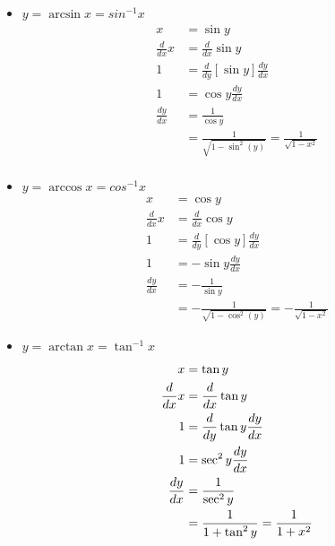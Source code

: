 \documentclass[12pt]{article}
\begin{document}
\begin{itemize}
    \item $y = \arcsin x = sin^{-1}x$
    \begin{equation}
    \begin{split}
        x &= \sin y \\
        \frac{d}{dx}x &= \frac{d}{dx} \sin y\\
        1 &= \frac{d}{dy}[\sin y]\frac{dy}{dx}\\
        1 &= \cos y \frac{dy}{dx}\\
        \frac{dy}{dx} &= \frac{1}{\cos y}\\
        &= \frac{1}{\sqrt{1-\sin^2(y)}} = \frac{1}{\sqrt{1-x^2}}\\
    \end{split}        
\end{equation}

    \item $y = \arccos x = cos^{-1}x$
    \begin{equation}
        \begin{split}
            x &= \cos y\\
            \frac{d}{dx} x &= \frac{d}{dx} \cos y\\
            1 &= \frac{d}{dy}[\cos y] \frac{dy}{dx}\\
            1 &= -\sin y \frac{dy}{dx}\\
            \frac{dy}{dx} &= -\frac{1}{\sin y}\\
            &= -\frac{1}{\sqrt{1-\cos^2(y)}} = -\frac{1}{\sqrt{1-x^2}}
        \end{split}
    \end{equation}

    \item $y = \arctan x = \tan^{-1} x$
    \begin{equation}
        \begin{split}
            x &= \tan y\\
            \frac{d}{dx} x &= \frac{d}{dx} \tan y\\
            1 &= \frac{d}{dy} \tan y \frac{dy}{dx}\\
            1 &= \sec^2 y \frac{dy}{dx}\\
            \frac{dy}{dx} &= \frac{1}{\sec^2 y}\\
            &= \frac{1}{1+\tan^2 y} = \frac{1}{1+x^2}\\
        \end{split}
    \end{equation}
\end{itemize}
\end{document}
